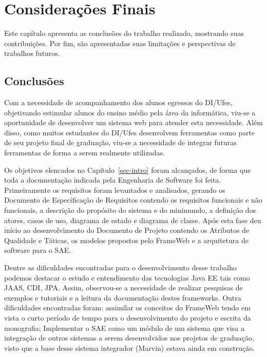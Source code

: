 \chapter{Considerações Finais}
\label{sec-conclusoes}

Este capítulo apresenta as conclusões do trabalho realizado, mostrando suas contribuições. Por fim, são apresentadas suas limitações e perspectivas de trabalhos futuros.

\section{Conclusões}
\label{sec-consideracoes-finais-conclusoes}

Com a necessidade de acompanhamento dos alunos egressos do DI/Ufes, objetivando estimular alunos do ensino médio pela área da informática, viu-se a oportunidade de desenvolver um sistema web para atender esta necessidade. Além disso, como muitos estudantes do DI/Ufes desenvolvem ferramentas como parte de seu projeto final de graduação, viu-se a necessidade de integrar futuras ferramentas de forma a serem realmente utilizadas.


Os objetivos elencados no Capítulo~\ref{sec-intro} foram alcançados, de forma que toda a documentação indicada pela Engenharia de Software foi feita. Primeiramente os requisitos foram levantados e analisados, gerando os Documento de Especificação de Requisitos contendo os requisitos funcionais e não funcionais, a descrição do propósito do sistema e do minimundo, a definição dos atores, casos de uso, diagrama de estado e diagrama de classe. Após esta fase deu início ao desenvolvimento do Documento de Projeto contendo os Atributos de Qualidade e Táticas, os modelos propostos pelo FrameWeb e a arquitetura de software para o SAE. 


Dentre as dificuldades encontradas para o desenvolvimento desse trabalho podemos destacar o estudo e entendimento das tecnologias Java EE tais como JAAS, CDI, JPA. Assim, observou-se a necessidade de realizar pesquisas de exemplos e tutoriais e a leitura da documentação destes frameworks. Outra dificuldades encontradas foram: assimilar os conceitos do FrameWeb tendo em vista o curto período de tempo para o desenvolvimento do projeto e escrita da monografia; Implementar o SAE como um módulo de um sistema que visa a integração de outros sistemas a serem desenvolvidos nos projetos de graduação, visto que a base desse sistema integrador (Marvin) estava ainda em construção.



